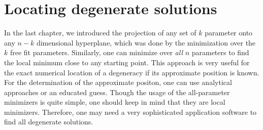 \chapter{Locating degenerate solutions}

In the last chapter, we introduced the projection of any set of $k$ parameter onto any $n-k$ dimensional hyperplane, which was done by the minimization over the $k$ free fit parameters. Similarly, one can minimize over {\em all} $n$ parameters to find the local minimum close to any starting point. This approach is very useful for the exact numerical location of a degeneracy if its approximate position is known. For the determination of the approximate positon, one can use analytical approaches or an educated guess. 
Though the usage of the all-parameter minimizers is quite simple, one should keep in mind that they are local minimizers. Therefore, one may need a very sophisticated application software to find all degenerate solutions.

